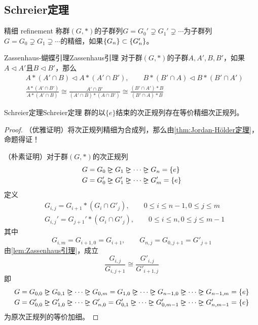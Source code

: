 \subsection{Schreier定理}

\begin{definition}{精细 refinement}
	称群$(G,*)$的子群列$G=G_0'\supsetneq G_1'\supsetneq \cdots$为子群列$G=G_0\supsetneq G_1\supsetneq \cdots$的精细，如果$\{ G_n \}\subset \{G_n'\}$。
\end{definition}

\begin{lemma}{Zassenhaus-蝴蝶引理}{Zassenhaus引理}
	对于群$(G,*)$的子群$A,A',B,B'$，如果$A\lhd A'$且$B\lhd B'$，那么
	\begin{align*}
		&A*(A'\cap B)\lhd A*(A'\cap B'),\qquad
		B*(B'\cap A)\lhd B*(B'\cap A')\\
		&\frac{A*(A'\cap B')}{A*(A'\cap B)}\cong
		\frac{A'\cap B'}{(A'\cap B)*(A\cap B')}\cong
		\frac{(B'\cap A')*B}{(B'\cap A)*B}
	\end{align*}
\end{lemma}

\begin{theorem}{Schreier定理}{Schreier定理}
	群的以$\{e\}$结束的次正规列存在等价精细次正规列。
\end{theorem}

\begin{proof}
	（优雅证明）将次正规列精细为合成列，那么由\ref{thm:Jordan-Hölder定理}，命题得证！
	
	（朴素证明）对于群$(G,*)$的次正规列
	\begin{align*}
		&G=G_0\rhdneq  G_1 \rhdneq  \cdots \rhdneq   G_n=\{e\}\\
		&G=G_0'\rhdneq  G_1' \rhdneq  \cdots \rhdneq   G_m'=\{e\}
	\end{align*}
	定义
	\begin{align*}
		&G_{i,j}=G_{i+1}*(G_i\cap G'_j),\qquad 0\le i\le n-1,0\le j\le m\\ 
		&G_{i,j}'=G_{j+1}'*(G_i\cap G'_j),\qquad 0\le i\le n,0\le j\le m-1
	\end{align*}
	其中
	$$
	G_{i,m}=G_{i+1,0}=G_{i+1},\qquad 
	G_{n,j}=G_{0,j+1}=G'_{j+1}
	$$
	由\ref{lem:Zassenhaus引理}，成立
	$$
	\frac{G_{i,j}}{G_{i,j+1}}\cong\frac{G'_{i,j}}{G'_{i+1,j}}
	$$
	即
	\begin{align*}
		&G=G_{0,0}\rhdneq  G_{0,1}\rhdneq  \cdots \rhdneq G_{0,m}=G_{1,0}\rhdneq \cdots \rhdneq  G_{n-1,0}\rhdneq  \cdots \rhdneq  G_{n-1,m}=\{e\}\\
		&G=G'_{0,0}\rhdneq  G'_{1,0}\rhdneq  \cdots \rhdneq  G'_{n,0}=G'_{0,1}\rhdneq \cdots \rhdneq  G'_{0,m-1}\rhdneq \cdots \rhdneq  G'_{n,m-1}=\{e\}
	\end{align*}
	为原次正规列的等价加细。
\end{proof}

